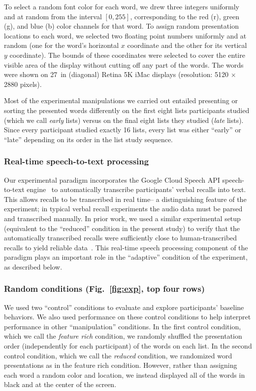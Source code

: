 \documentclass[11pt]{article}
\begin{document}
To select a random font color for each word, we drew three integers uniformly
and at random from the interval $\left[0, 255\right]$, corresponding to the red
(r), green (g), and blue (b) color channels for that word. To assign random
presentation locations to each word, we selected two floating point numbers
uniformly and at random (one for the word's horizontal $x$ coordinate and the
other for its vertical $y$ coordinate). The bounds of these coordinates were
selected to cover the entire visible area of the display without cutting off
any part of the words. The words were shown on 27~in (diagonal) Retina 5K iMac
displays (resolution: 5120 $\times$ 2880 pixels).

Most of the experimental manipulations we carried out entailed presenting or
sorting the presented words differently on the first eight lists participants
studied (which we call \textit{early} lists) versus on the final eight lists
they studied (\textit{late} lists). Since every participant studied exactly 16
lists, every list was either ``early'' or ``late'' depending on its order in
the list study sequence.


\subsubsection*{Real-time speech-to-text processing}

Our experimental paradigm incorporates the Google Cloud Speech API
speech-to-text engine~\citep{HalpEtal16} to automatically transcribe
participants' verbal recalls into text. This allows recalls to be transcribed
in real time-- a distinguishing feature of the experiment; in typical verbal
recall experiments the audio data must be parsed and transcribed manually. In
prior work, we used a similar experimental setup (equivalent to the ``reduced''
condition in the present study) to verify that the automatically transcribed
recalls were sufficiently close to human-transcribed recalls to yield reliable
data~\citep{ZimaEtal18}. This real-time speech processing component of the
paradigm plays an important role in the ``adaptive'' condition of the
experiment, as described below.

\subsubsection*{Random conditions (Fig.~\ref{fig:exp}, top four rows)}

We used two ``control'' conditions to evaluate and explore participants'
baseline behaviors. We also used performance on these control conditions to
help interpret performance in other ``manipulation'' conditions. In the first
control condition, which we call the \textit{feature rich} condition, we
randomly shuffled the presentation order (independently for each participant)
of the words on each list. In the second control condition, which we call the
\textit{reduced} condition, we randomized word presentations as in the feature
rich condition. However, rather than assigning each word a random color and
location, we instead displayed all of the words in black and at the center of
the screen.
\end{document}
